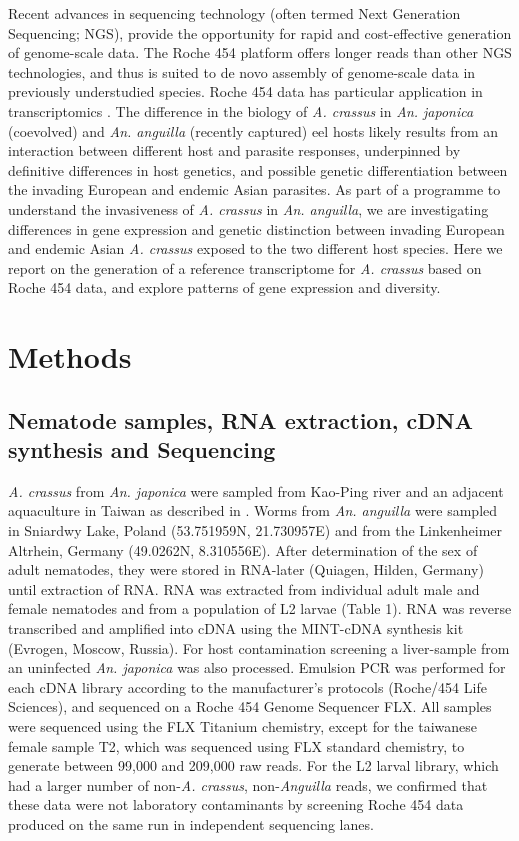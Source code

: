 \documentclass[10pt]{bmc_article}
\newenvironment{bmcformat}{\begin{raggedright}\baselineskip20pt\sloppy\setboolean{publ}{false}}{\end{raggedright}\baselineskip20pt\sloppy}
\begin{document}
\begin{bmcformat}
Recent advances in sequencing technology (often termed Next Generation
Sequencing; NGS), provide the opportunity for rapid and cost-effective
generation of genome-scale data. The Roche 454 platform
\cite{pmid16056220} offers longer reads than other NGS technologies,
and thus is suited to de novo assembly of genome-scale data in
previously understudied species. Roche 454 data has particular
application in transcriptomics \cite{pmid20950480}. The difference in
the biology of \textit{A. crassus} in \textit{An. japonica}
(coevolved) and \textit{An. anguilla} (recently captured) eel hosts
likely results from an interaction between different host and parasite
responses, underpinned by definitive differences in host genetics, and
possible genetic differentiation between the invading European and
endemic Asian parasites. As part of a programme to understand the
invasiveness of \textit{A. crassus} in \textit{An. anguilla}, we are
investigating differences in gene expression and genetic distinction
between invading European and endemic Asian \textit{A. crassus}
exposed to the two different host species. Here we report on the
generation of a reference transcriptome for \textit{A. crassus} based
on Roche 454 data, and explore patterns of gene expression and
diversity.


\section*{Methods}


\subsection*{Nematode samples, RNA extraction, cDNA synthesis and Sequencing}

\textit{A. crassus} from \textit{An. japonica} were sampled from
Kao-Ping river and an adjacent aquaculture in Taiwan as described in
\cite{heitlinger_massive_2009}. Worms from \textit{An. anguilla} were sampled
in Sniardwy Lake, Poland (53.751959N, 21.730957E) and from the
Linkenheimer Altrhein, Germany (49.0262N, 8.310556E). After
determination of the sex of adult nematodes, they were stored in
RNA-later (Quiagen, Hilden, Germany) until extraction of RNA. RNA was
extracted from individual adult male and female nematodes and from a
population of L2 larvae (Table 1). RNA was reverse transcribed and
amplified into cDNA using the MINT-cDNA synthesis kit (Evrogen,
Moscow, Russia).  For host contamination screening a liver-sample from
an uninfected \textit{An. japonica} was also processed.  Emulsion PCR
was performed for each cDNA library according to the manufacturer’s
protocols (Roche/454 Life Sciences), and sequenced on a Roche 454
Genome Sequencer FLX. All samples were sequenced using the FLX
Titanium chemistry, except for the taiwanese female sample T2, which
was sequenced using FLX standard chemistry, to generate between 99,000
and 209,000 raw reads. For the L2 larval library, which had a larger
number of non-\textit{A. crassus}, non-\textit{Anguilla} reads, we
confirmed that these data were not laboratory contaminants by
screening Roche 454 data produced on the same run in independent
sequencing lanes.



\end{bmcformat}
\end{document}
